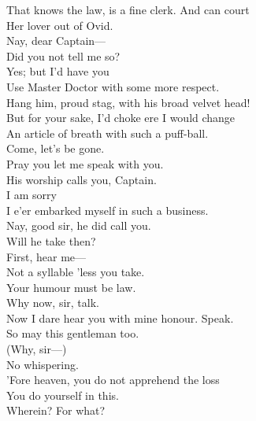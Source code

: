\documentclass[a4paper,oneside,12pt]{memoir}
\begin{document}
\begin{drama*}
That knows the law, is a fine clerk. And can court\\
Her lover out of Ovid.\\
\dapperspeaks {} Nay, dear Captain---\\
\facespeaks Did you not tell me so?\\
\dapperspeaks {} Yes; but I'd have you\\
Use Master Doctor with some more respect.\\
\facespeaks Hang him, proud stag, with his broad velvet head!\\
But for your sake, I'd choke ere I would change\\
An article of breath with such a puff-ball.\\
Come, let's be gone.\\
\subtlespeaks {} Pray you let me speak with you.\\
\dapperspeaks His worship calls you, Captain.\\
\facespeaks {} I am sorry\\
I e'er embarked myself in such a business.\\
\dapperspeaks Nay, good sir, he did call you.\\
\facespeaks {} Will he take then?\\
\subtlespeaks First, hear me---\\
\facespeaks {} Not a syllable 'less you take.\\
\subtlespeaks Your humour must be law.\\
\facespeaks {} Why now, sir, talk.\\
Now I dare hear you with mine honour. Speak.\\
So may this gentleman too.\\
\subtlespeaks {} (Why, sir---)\\
\facespeaks {} No whispering.\\
\subtlespeaks 'Fore heaven, you do not apprehend the loss\\
You do yourself in this.\\
\facespeaks {} Wherein? For what?\\

\end{drama*}
\end{document}
